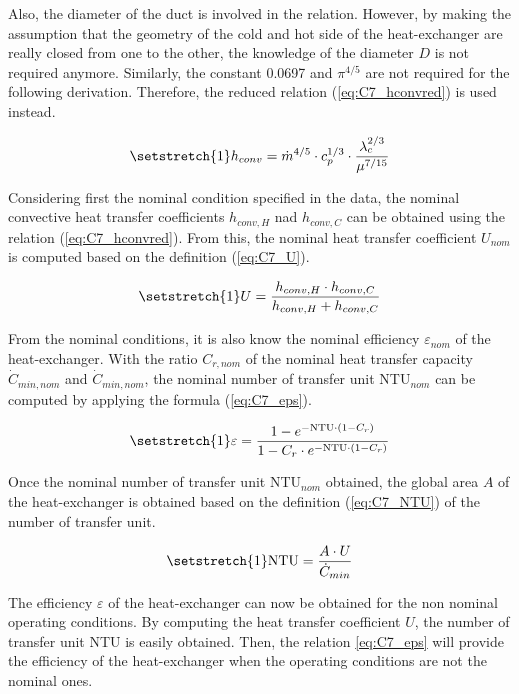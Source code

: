 Also, the diameter of the duct is involved in the relation. However, by making the assumption that the geometry of the cold and hot side of the heat-exchanger are really closed from one to the other, the knowledge of the diameter $D$ is not required anymore. Similarly, the constant 0.0697 and $\pi^{4/5}$ are not required for the following derivation. Therefore, the reduced relation (\ref{eq:C7_hconvred}) is used instead.

\begin{equation}
    \setstretch{1}
    h_{conv} = \dot{m}^{4/5}\cdot c_p^{1/3}\cdot \frac{\lambda_c^{2/3}}{\mu^{7/15}}\label{eq:C7_hconvred}
\end{equation}

Considering first the nominal condition specified in the data, the nominal convective heat transfer coefficients $h_{conv,H}$ nad $h_{conv,C}$ can be obtained using the relation (\ref{eq:C7_hconvred}). From this, the nominal heat transfer coefficient $U_{nom}$ is computed based on the definition (\ref{eq:C7_U}).

\begin{equation}
    \setstretch{1}
    U = \frac{h_{conv,H}\cdot h_{conv,C}}{h_{conv,H} + h_{conv,C}}\label{eq:C7_U}
\end{equation}

From the nominal conditions, it is also know the nominal efficiency $\varepsilon_{nom}$ of the heat-exchanger. With the ratio $C_{r,nom}$ of the nominal heat transfer capacity $\dot{C}_{min,nom}$ and $\dot{C}_{min,nom}$, the nominal number of transfer unit NTU$_{nom}$ can be computed by applying the formula (\ref{eq:C7_eps}).

\begin{align}
    \setstretch{1}
    \varepsilon = \frac{1 - e^{-\text{NTU}\cdot (1 - C_r)}}{1 - C_r\cdot e^{-\text{NTU}\cdot (1 - C_r)}}\label{eq:C7_eps}
\end{align}

Once the nominal number of transfer unit NTU$_{nom}$ obtained, the global area $A$ of the heat-exchanger is obtained based on the definition (\ref{eq:C7_NTU}) of the number of transfer unit.

\begin{equation}
    \setstretch{1}
    \text{NTU} = \frac{A\cdot U}{\dot{C}_{min}} \label{eq:C7_NTU}
\end{equation}

The efficiency $\varepsilon$ of the heat-exchanger can now be obtained for the non nominal operating conditions. By computing the heat transfer coefficient $U$, the number of transfer unit NTU is easily obtained. Then, the relation \ref{eq:C7_eps} will provide the efficiency of the heat-exchanger when the operating conditions are not the nominal ones.